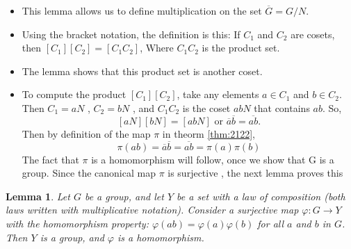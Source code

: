 \documentclass[
]{book}
\providecommand{\tightlist}{%
  \setlength{\itemsep}{0pt}\setlength{\parskip}{0pt}}
\newtheorem{lemma}{Lemma}[chapter]
\theoremstyle{definition}
\theoremstyle{definition}
\theoremstyle{definition}
\theoremstyle{definition}
\theoremstyle{remark}
\begin{document}
\begin{itemize}
\tightlist
\item
  This lemma allows us to define multiplication on the set \(\overline{G} = G / N\).
\item
  Using the bracket
  notation, the definition is this: If \(C_1\) and \(C_2\) are cosets, then \([C_1][C_2] = [C_1 C_2]\),
  Where \(C_1 C_2\) is the product set.
\item
  The lemma shows that this product set is another coset.\\
\item
  To compute the product \([C_1][C_2]\), take any elements \(a \in C_1\) and \(b \in C_2\). Then \(C_1 = aN\) ,
  \(C_2 = bN\) , and \(C_1 C_2\) is the coset \(a b N\) that contains \(ab\). So,
  \[[aN][bN] = [abN] \text{ or } \overline{a}\overline{b} = \overline{ab}.\]
  Then by definition of the map \(\pi\) in theorm \ref{thm:2122},
  \[\pi(ab)=\overline{a}\overline{b} = \overline{ab}=\pi(a)\pi(b)\]
  The fact that \(\pi\) is a homomorphism will follow, once we show that G is a group.
  Since the canonical map \(\pi\) is surjective , the next lemma proves this
\end{itemize}

\begin{lemma}
\protect\hypertarget{lem:unnamed-chunk-44}{}\label{lem:unnamed-chunk-44}Let \(G\) be a group, and let \(Y\) be a set with a law of composition (both laws written with multiplicative notation). Consider a surjective map \(\varphi : G \to Y\) with the homomorphism property: \(\varphi(ab) = \varphi(a)\varphi(b)\) for all \(a\) and \(b\) in \(G\). Then \(Y\) is a group, and \(\varphi\) is a homomorphism.
\end{lemma}
\end{document}
